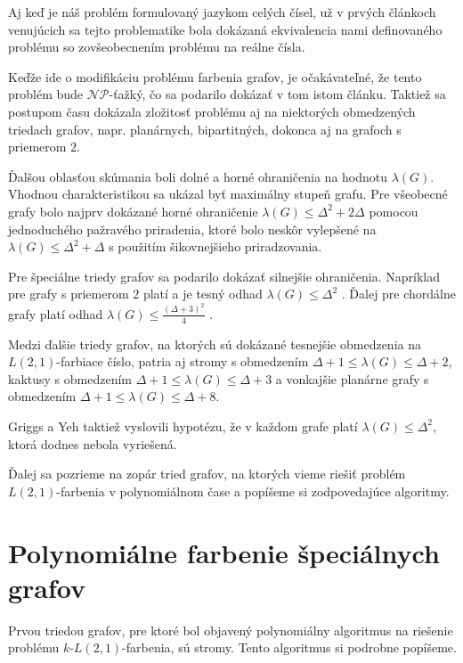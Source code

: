 Aj keď je náš problém formulovaný jazykom celých čísel, už v prvých článkoch
venujúcich sa tejto problematike bola dokázaná ekvivalencia
nami definovaného problému so zovšeobecnením problému na reálne čísla\cite{griggs_yeh_tree}.

Keďže ide o modifikáciu problému farbenia grafov, je očakávateľné, že tento
problém bude $\mathcal{NP}$-ťažký, čo sa podarilo dokázať v tom istom článku.
Taktiež sa postupom času dokázala zložitosť problému aj na niektorých obmedzených
triedach grafov, napr. planárnych, bipartitných, dokonca aj na grafoch s
priemerom $2$\cite{color_survey}.

Ďalšou oblasťou skúmania boli dolné a horné ohraničenia na hodnotu $\lambda(G)$.
Vhodnou charakteristikou sa ukázal byť maximálny stupeň grafu. Pre všeobecné
grafy bolo najprv dokázané horné ohraničenie $\lambda(G) \leq \Delta^2 + 2\Delta$
pomocou jednoduchého pažravého priradenia\cite{griggs_yeh_tree},
ktoré bolo neskôr vylepšené na $\lambda(G) \leq \Delta^2 + \Delta$ s použitím
šikovnejšieho priradzovania\cite{chang_kuo}.

Pre špeciálne triedy grafov sa podarilo dokázať silnejšie ohraničenia. Napríklad
pre grafy s priemerom $2$ platí a je tesný odhad $\lambda(G) \leq \Delta^2$\cite{griggs_yeh_tree}
. Ďalej pre chordálne grafy platí odhad $\lambda(G) \leq \frac{\left( \Delta + 3 \right)^2}{4}$\cite{griggs_yeh_tree}
.

Medzi ďalšie triedy grafov, na ktorých sú dokázané tesnejšie obmedzenia na $L(2,1)$-farbiace
číslo, patria aj stromy s obmedzením $\Delta + 1 \leq \lambda(G) \leq \Delta + 2$\cite{griggs_yeh_tree},
kaktusy s obmedzením $\Delta + 1 \leq \lambda(G) \leq \Delta + 3$\cite{kaktusy} a vonkajšie planárne
grafy s obmedzením $\Delta + 1 \leq \lambda(G) \leq \Delta + 8$\cite{outer_planar_bound}.

Griggs a Yeh taktiež vyslovili hypotézu, že v každom grafe platí $\lambda(G) \leq \Delta^2$,
ktorá dodnes nebola vyriešená.

Ďalej sa pozrieme na zopár tried grafov, na ktorých vieme riešiť problém $L(2,1)$-farbenia
v polynomiálnom čase a popíšeme si zodpovedajúce algoritmy.

\section{Polynomiálne farbenie špeciálnych grafov}

Prvou triedou grafov, pre ktoré bol objavený polynomiálny algoritmus na riešenie
problému $k$-$L(2,1)$-farbenia, sú stromy\cite{chang_kuo}. Tento algoritmus si
podrobne popíšeme.

